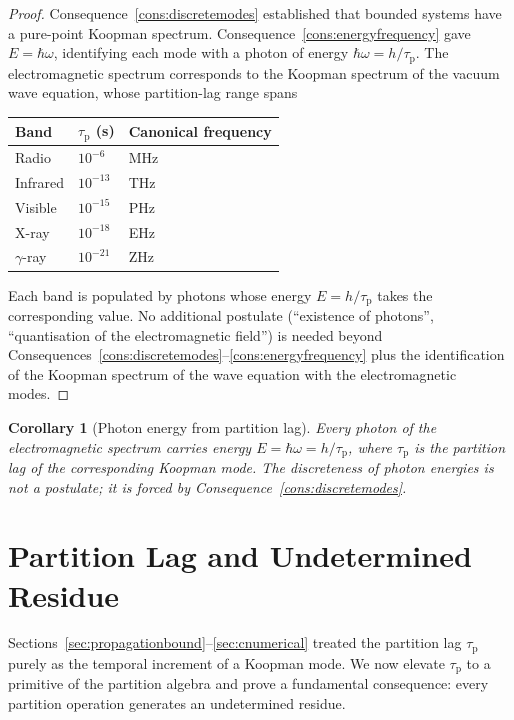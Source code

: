 \documentclass[11pt,twocolumn,a4paper]{article}
\theoremstyle{axiomstyle}
\theoremstyle{conseqstyle}
\newtheorem{corollary}{Corollary}
\theoremstyle{definition}
\theoremstyle{remark}
\newcommand{\taup}{\tau_{\mathrm{p}}}
\begin{document}
\begin{proof}
Consequence~\ref{cons:discretemodes} established that bounded systems have a pure-point Koopman spectrum. Consequence~\ref{cons:energyfrequency} gave $E=\hbar\omega$, identifying each mode with a photon of energy $\hbar\omega=h/\taup$. The electromagnetic spectrum corresponds to the Koopman spectrum of the vacuum wave equation, whose partition-lag range spans
\begin{center}
\begin{tabular}{lll}
\toprule
Band & $\taup$ (s) & Canonical frequency \\
\midrule
Radio       & $10^{-6}$  & MHz \\
Infrared    & $10^{-13}$ & THz \\
Visible     & $10^{-15}$ & PHz \\
X-ray       & $10^{-18}$ & EHz \\
$\gamma$-ray & $10^{-21}$ & ZHz \\
\bottomrule
\end{tabular}
\end{center}
Each band is populated by photons whose energy $E=h/\taup$ takes the corresponding value. No additional postulate (``existence of photons'', ``quantisation of the electromagnetic field'') is needed beyond Consequences~\ref{cons:discretemodes}--\ref{cons:energyfrequency} plus the identification of the Koopman spectrum of the wave equation with the electromagnetic modes.
\end{proof}

\begin{corollary}[Photon energy from partition lag]\label{cor:photontaup}
Every photon of the electromagnetic spectrum carries energy $E=\hbar\omega=h/\taup$, where $\taup$ is the partition lag of the corresponding Koopman mode. The discreteness of photon energies is not a postulate; it is forced by Consequence~\ref{cons:discretemodes}.
\end{corollary}

\section{Partition Lag and Undetermined Residue}
\label{sec:partitionlag}

Sections~\ref{sec:propagationbound}--\ref{sec:cnumerical} treated the partition lag $\taup$ purely as the temporal increment of a Koopman mode. We now elevate $\taup$ to a primitive of the partition algebra and prove a fundamental consequence: every partition operation generates an undetermined residue.
\end{document}
